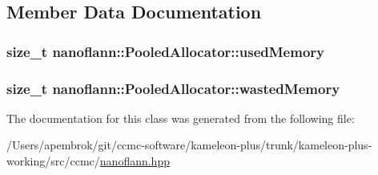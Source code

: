 \subsection{Member Data Documentation}
\hypertarget{classnanoflann_1_1_pooled_allocator_a4152d7a1d043d57aad464f11117d6e90}{
\subsubsection[{used\-Memory}]{\setlength{\rightskip}{0pt plus 5cm}size\-\_\-t nanoflann\-::\-Pooled\-Allocator\-::used\-Memory}}\label{classnanoflann_1_1_pooled_allocator_a4152d7a1d043d57aad464f11117d6e90}
\hypertarget{classnanoflann_1_1_pooled_allocator_aeb073342f83393f414888292d165738d}{
\subsubsection[{wasted\-Memory}]{\setlength{\rightskip}{0pt plus 5cm}size\-\_\-t nanoflann\-::\-Pooled\-Allocator\-::wasted\-Memory}}\label{classnanoflann_1_1_pooled_allocator_aeb073342f83393f414888292d165738d}


The documentation for this class was generated from the following file\-:\begin{DoxyCompactItemize}
\item 
/\-Users/apembrok/git/ccmc-\/software/kameleon-\/plus/trunk/kameleon-\/plus-\/working/src/ccmc/\hyperlink{nanoflann_8hpp}{nanoflann.\-hpp}\end{DoxyCompactItemize}
